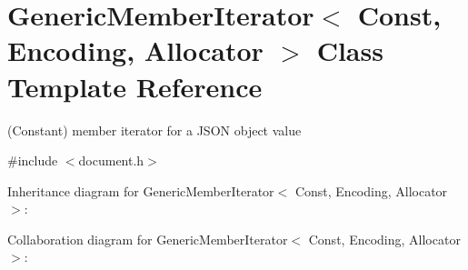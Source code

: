 \hypertarget{class_generic_member_iterator}{}\section{Generic\+Member\+Iterator$<$ Const, Encoding, Allocator $>$ Class Template Reference}
\label{class_generic_member_iterator}


(Constant) member iterator for a J\+S\+ON object value  




{\ttfamily \#include $<$document.\+h$>$}



Inheritance diagram for Generic\+Member\+Iterator$<$ Const, Encoding, Allocator $>$\+:


Collaboration diagram for Generic\+Member\+Iterator$<$ Const, Encoding, Allocator $>$\+:
